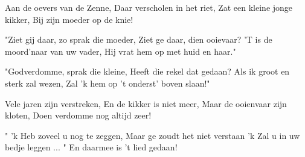 \footnotemark [
ititle={Aan de oevers aan de Zenne}]


\beginverse
Aan de oevers van de Zenne,
Daar verscholen in het riet,
Zat een kleine jonge kikker,
Bij zijn moeder op de knie!
\endverse

\beginverse
"Ziet gij daar, zo sprak die moeder,
Ziet ge daar, dien ooievaar?
'T is de moord'naar van uw vader,
Hij vrat hem op met huid en haar."
\endverse

\beginverse
"Godverdomme, sprak die kleine,
Heeft die rekel dat gedaan?
Als ik groot en sterk zal wezen,
Zal 'k hem op 't onderst' boven slaan!"
\endverse

\beginverse
Vele jaren zijn verstreken,
En de kikker is niet meer,
Maar de ooienvaar zijn kloten,
Doen verdomme nog altijd zeer!
\endverse

\beginverse
" 'k Heb zoveel u nog te zeggen,
Maar ge zoudt het niet verstaan
'k Zal u in uw bedje leggen ... "
En daarmee is 't lied gedaan!
\endverse
\endsong